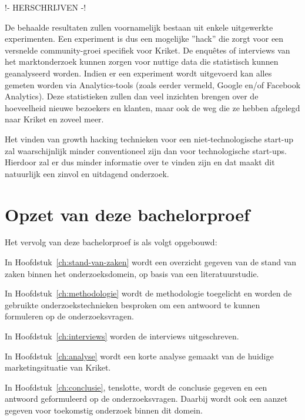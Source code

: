 !- HERSCHRIJVEN -!

De behaalde resultaten zullen voornamelijk bestaan uit enkele uitgewerkte experimenten. Een experiment is dus een mogelijke ”hack” die zorgt voor een versnelde community-groei specifiek voor Kriket. De enquêtes of interviews van het marktonderzoek kunnen zorgen voor nuttige data die statistisch kunnen geanalyseerd worden. Indien er een experiment wordt uitgevoerd kan alles gemeten worden via Analytics-tools (zoals eerder vermeld, Google en/of Facebook Analytics). Deze statistieken zullen dan veel inzichten brengen over de hoeveelheid nieuwe bezoekers en klanten, maar ook de weg die ze hebben afgelegd naar Kriket en zoveel meer.

Het vinden van growth hacking technieken voor een niet-technologische start-up zal waarschijnlijk minder conventioneel zijn dan voor technologische start-ups. Hierdoor zal er dus minder informatie over te vinden zijn en dat maakt dit natuurlijk een zinvol en uitdagend onderzoek.

\section{Opzet van deze bachelorproef}
\label{sec:opzet-bachelorproef}


Het vervolg van deze bachelorproef is als volgt opgebouwd:

In Hoofdstuk~\ref{ch:stand-van-zaken} wordt een overzicht gegeven van de stand van zaken binnen het onderzoeksdomein, op basis van een literatuurstudie.

In Hoofdstuk~\ref{ch:methodologie} wordt de methodologie toegelicht en worden de gebruikte onderzoekstechnieken besproken om een antwoord te kunnen formuleren op de onderzoeksvragen.

In Hoofdstuk~\ref{ch:interviews} worden de interviews uitgeschreven.

In Hoofdstuk~\ref{ch:analyse} wordt een korte analyse gemaakt van de huidige marketingsituatie van Kriket.

In Hoofdstuk~\ref{ch:conclusie}, tenslotte, wordt de conclusie gegeven en een antwoord geformuleerd op de onderzoeksvragen. Daarbij wordt ook een aanzet gegeven voor toekomstig onderzoek binnen dit domein.

